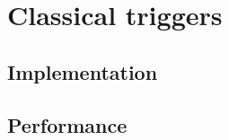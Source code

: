 
\chapter{Classical triggers}
\label{chap:classical-triggers}


\section{Implementation}
\label{sec:hardware-triggers-implementation}

\section{Performance}
\label{sec:hardware-triggers-performance}




